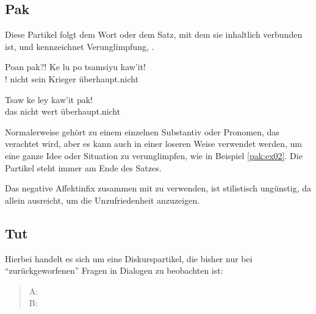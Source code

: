 \subsection{Pak} 
Diese Partikel folgt dem Wort oder dem Satz, mit dem sie inhaltlich verbunden ist, und kennzeichnet Verunglimpfung,  .

\begin{interlin}
	\gll Poan pak?! Ke lu po tsamsiyu kaw'it! \\
	 ! nicht sein  Krieger überhaupt.nicht \\
\end{interlin}

\begin{interlin} \label{pak:ex02}
	\gll Tsaw ke ley kaw'it pak! \\
	das nicht wert überhaupt.nicht  \\
	 \Ipawl{}
\end{interlin}

\noindent Normalerweise gehört  zu einem einzelnen Substantiv oder Pronomen, das verachtet wird, aber es kann auch in einer loseren Weise verwendet werden, um eine ganze Idee oder Situation zu verunglimpfen, wie in Beispiel \ref{pak:ex02}. Die Partikel steht immer am Ende des Satzes.

Das negative Affektinfix  zusammen mit  zu verwenden, ist stilistisch ungünstig, da  allein ausreicht, um die Unzufriedenheit anzuzeigen. 

\subsection{Tut} Hierbei handelt es sich um eine Diskurspartikel, die bisher nur bei ``zurückgeworfenen'' Fragen in Dialogen zu beobachten ist: 

\begin{quotation}
	\noindent A:   \\
	\noindent B:  
\end{quotation}

